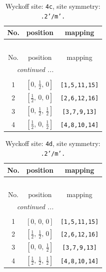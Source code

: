 \documentclass[fleqn,8pt]{jsarticle}
\begin{document}
\renewcommand{\arraystretch}{1.2}
\begin{longtable}{ccc}
\caption{Wyckoff site: {\tt 4c}, site symmetry: {\tt .2'/m'.}}
 \\
 \hline \hline
No. & position & mapping \\ \hline \endfirsthead

\multicolumn{2}{l}{\tablename\ \thetable{}} \\
 \hline \hline
No. & position & mapping \\ \hline \endhead

 \hline \hline
\multicolumn{2}{r}{\footnotesize\it continued ...} \\ \endfoot

 \hline \hline
\multicolumn{2}{r}{} \\ \endlastfoot

1 & $\left[ 0,\, \frac{1}{2},\, 0 \right]$ & {\tt [1,5,11,15]} \\ \hline
2 & $\left[ \frac{1}{2},\, 0,\, 0 \right]$ & {\tt [2,6,12,16]} \\ \hline
3 & $\left[ 0,\, \frac{1}{2},\, \frac{1}{2} \right]$ & {\tt [3,7,9,13]} \\ \hline
4 & $\left[ \frac{1}{2},\, 0,\, \frac{1}{2} \right]$ & {\tt [4,8,10,14]} \\
\end{longtable}
\renewcommand{\arraystretch}{1.2}
\begin{longtable}{ccc}
\caption{Wyckoff site: {\tt 4d}, site symmetry: {\tt .2'/m'.}}
 \\
 \hline \hline
No. & position & mapping \\ \hline \endfirsthead

\multicolumn{2}{l}{\tablename\ \thetable{}} \\
 \hline \hline
No. & position & mapping \\ \hline \endhead

 \hline \hline
\multicolumn{2}{r}{\footnotesize\it continued ...} \\ \endfoot

 \hline \hline
\multicolumn{2}{r}{} \\ \endlastfoot

1 & $\left[ 0,\, 0,\, 0 \right]$ & {\tt [1,5,11,15]} \\ \hline
2 & $\left[ \frac{1}{2},\, \frac{1}{2},\, 0 \right]$ & {\tt [2,6,12,16]} \\ \hline
3 & $\left[ 0,\, 0,\, \frac{1}{2} \right]$ & {\tt [3,7,9,13]} \\ \hline
4 & $\left[ \frac{1}{2},\, \frac{1}{2},\, \frac{1}{2} \right]$ & {\tt [4,8,10,14]} \\
\end{longtable}
\end{document}
